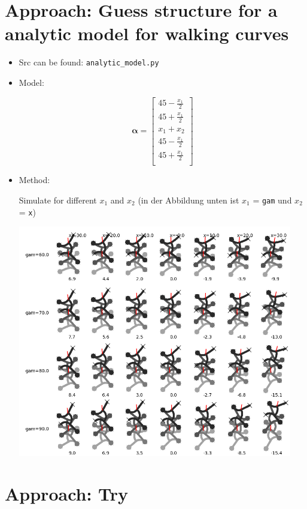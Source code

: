 \documentclass[10pt,a4paper]{article}
\begin{document}
\section{Approach: Guess structure for a analytic model for walking curves}

\begin{itemize}

\item Src can be found: \texttt{analytic\_model.py}

\item Model:

\begin{equation}
\bm{\alpha} = \begin{bmatrix}
45 - \frac{x_1}{2} \\
45 + \frac{x_1}{2} \\
x_1 + x_2 \\
45 - \frac{x_1}{2}  \\
45 + \frac{x_1}{2} \\
\end{bmatrix}
\end{equation}

\item Method:

Simulate for different $x_1$ and $x_2$ (in der Abbildung unten ist $x_1$ = \texttt{gam} und $x_2$ = \texttt{x})


\includegraphics[width=12cm]{../pics/model_1/GeckoBotGait_2cyc.png}

\end{itemize}


\section{Approach: Try }
\end{document}
